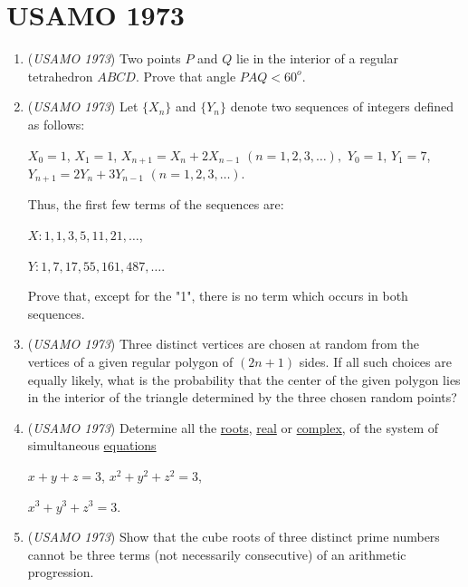 \section{USAMO 1973}
        \begin{enumerate}
        	\item (\textit{USAMO 1973}) Two points $P$ and $Q$ lie in the interior of a regular tetrahedron $ABCD$. Prove that angle $PAQ<60^o$.


 

	\item (\textit{USAMO 1973}) Let $\{X_n\}$ and $\{Y_n\}$ denote two sequences of integers defined as follows:


  $X_0=1$, $X_1=1$, $X_{n+1}=X_n+2X_{n-1}$ $(n=1,2,3,\dots),$
$Y_0=1$, $Y_1=7$, $Y_{n+1}=2Y_n+3Y_{n-1}$ $(n=1,2,3,\dots)$.

 Thus, the first few terms of the sequences are:


  $X:1, 1, 3, 5, 11, 21, \dots$,

  $Y:1, 7, 17, 55, 161, 487, \dots$.

 Prove that, except for the "1", there is no term which occurs in both sequences.


 

	\item (\textit{USAMO 1973}) Three distinct vertices are chosen at random from the vertices of a given regular polygon of $(2n+1)$ sides. If all such choices are equally likely, what is the probability that the center of the given polygon lies in the interior of the triangle determined by the three chosen random points?


 

	\item (\textit{USAMO 1973}) Determine all the \href{https://artofproblemsolving.com/wiki/index.php?title=Root}{roots}, \href{https://artofproblemsolving.com/wiki/index.php?title=Real}{real} or \href{https://artofproblemsolving.com/wiki/index.php?title=Complex}{complex}, of the system of simultaneous \href{https://artofproblemsolving.com/wiki/index.php?title=Equation}{equations}


 $x+y+z=3$,
$x^2+y^2+z^2=3$,


 
$x^3+y^3+z^3=3$.

 

	\item (\textit{USAMO 1973}) Show that the cube roots of three distinct prime numbers cannot be three terms (not necessarily consecutive) of an arithmetic progression.


 

\end{enumerate}